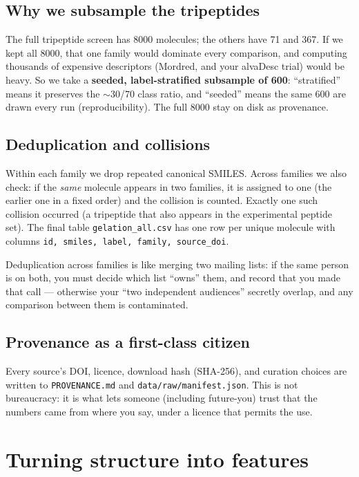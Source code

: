 \documentclass[11pt]{article}
\newenvironment{callout}[2][blue]{%
  \par\smallskip\colorlet{shadecolor}{#1!7}%
  \begin{shaded}\noindent{\color{#1!55!black}\bfseries #2.\ }\ignorespaces}%
  {\end{shaded}\smallskip}
\newcommand{\code}[1]{\texttt{#1}}
\begin{document}
\subsection{Why we subsample the tripeptides}
The full tripeptide screen has 8000 molecules; the others have 71 and 367. If we
kept all 8000, that one family would dominate every comparison, and computing
thousands of expensive descriptors (Mordred, and your alvaDesc trial) would be
heavy. So we take a \textbf{seeded, label-stratified subsample of 600}:
``stratified'' means it preserves the $\sim$30/70 class ratio, and ``seeded''
means the same 600 are drawn every run (reproducibility). The full 8000 stay on
disk as provenance.

\subsection{Deduplication and collisions}
Within each family we drop repeated canonical SMILES. Across families we also
check: if the \emph{same} molecule appears in two families, it is assigned to one
(the earlier one in a fixed order) and the collision is counted. Exactly one such
collision occurred (a tripeptide that also appears in the experimental peptide
set). The final table \code{gelation\_all.csv} has one row per unique molecule with
columns \code{id, smiles, label, family, source\_doi}.

\begin{callout}[violet]{Analogy}
Deduplication across families is like merging two mailing lists: if the same
person is on both, you must decide which list ``owns'' them, and record that you
made that call --- otherwise your ``two independent audiences'' secretly overlap,
and any comparison between them is contaminated.
\end{callout}

\subsection{Provenance as a first-class citizen}
Every source's DOI, licence, download hash (SHA-256), and curation choices are
written to \code{PROVENANCE.md} and \code{data/raw/manifest.json}. This is not
bureaucracy: it is what lets someone (including future-you) trust that the numbers
came from where you say, under a licence that permits the use.

\section{Turning structure into features}\label{sec:features}
\end{document}
